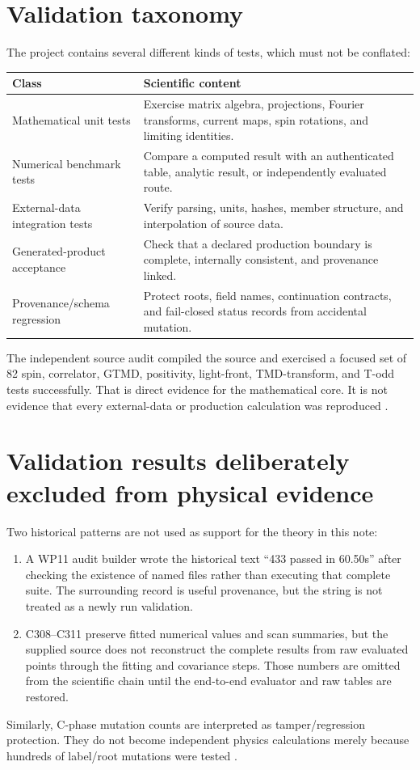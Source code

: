\documentclass[11pt,oneside]{book}
\begin{document}
\section{Validation taxonomy}

The project contains several different kinds of tests, which must not be conflated:
\begin{longtable}{p{}p{}}
\toprule
\textbf{Class} & \textbf{Scientific content}\\
\midrule
Mathematical unit tests & Exercise matrix algebra, projections, Fourier transforms, current maps, spin rotations, and limiting identities.\\
Numerical benchmark tests & Compare a computed result with an authenticated table, analytic result, or independently evaluated route.\\
External-data integration tests & Verify parsing, units, hashes, member structure, and interpolation of source data.\\
Generated-product acceptance & Check that a declared production boundary is complete, internally consistent, and provenance linked.\\
Provenance/schema regression & Protect roots, field names, continuation contracts, and fail-closed status records from accidental mutation.\\
\bottomrule
\end{longtable}
The independent source audit compiled the source and exercised a focused set of 82 spin, correlator, GTMD, positivity, light-front, TMD-transform, and T-odd tests successfully.  That is direct evidence for the mathematical core.  It is not evidence that every external-data or production calculation was reproduced \cite{DWSourceAudit2026}.

\section{Validation results deliberately excluded from physical evidence}

Two historical patterns are not used as support for the theory in this note:
\begin{enumerate}[label=(\alph*)]
 \item A WP11 audit builder wrote the historical text ``433 passed in 60.50s'' after checking the existence of named files rather than executing that complete suite.  The surrounding record is useful provenance, but the string is not treated as a newly run validation.
 \item C308--C311 preserve fitted numerical values and scan summaries, but the supplied source does not reconstruct the complete results from raw evaluated points through the fitting and covariance steps.  Those numbers are omitted from the scientific chain until the end-to-end evaluator and raw tables are restored.
\end{enumerate}
Similarly, C-phase mutation counts are interpreted as tamper/regression protection.  They do not become independent physics calculations merely because hundreds of label/root mutations were tested \cite{DWSourceAudit2026}.
\end{document}
